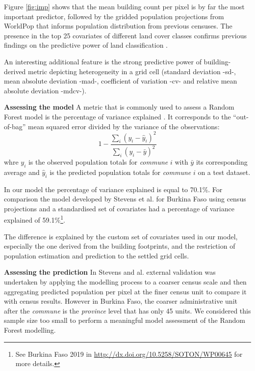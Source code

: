 \documentclass[]{book}
\begin{document}
Figure \ref{fig:imp} shows that the mean building count per pixel is by
far the most important predictor, followed by the gridded population
projections from WorldPop that informs population distribution from
previous censuses. The presence in the top 25 covariates of different
land cover classes confirms previous findings on the predictive power of
land classification \citep{lloyd2019global}.

An interesting additional feature is the strong predictive power of
building-derived metric depicting heterogeneity in a grid cell (standard
deviation -sd-, mean absolute deviation -mad-, coefficient of variation
-cv- and relative mean absolute deviation -mdcv-).

\textbf{Assessing the model} A metric that is commonly used to assess a
Random Forest model is the percentage of variance explained
\citep{liaw2002}. It corresponds to the ``out-of-bag'' mean squared
error divided by the variance of the observations:
\[1 - \frac{\sum_i (y_i - \hat{y}_i)^2}{\sum_i (y_i - \bar{y})^2}\]whre
\(y_i\) is the observed population totals for \emph{commune} \(i\) with
\(\bar{y}\) its corresponding average and \(\hat{y}_i\) is the predicted
population totals for \emph{commune} \(i\) on a test dataset.

In our model the percentage of variance explained is equal to 70.1\%.
For comparison the model developed by Stevens et al.
\citeyearpar{stevens2015disaggregating} for Burkina Faso using census
projections and a standardised set of covariates \citep{lloyd2019global}
had a percentage of variance explained of 59.1\%\footnote{See Burkina
  Faso 2019 in \url{http://dx.doi.org/10.5258/SOTON/WP00645} for more
  details.}.

The difference is explained by the custom set of covariates used in our
model, especially the one derived from the building footprints, and the
restriction of population estimation and prediction to the settled grid
cells.

\textbf{Assessing the prediction} In Stevens and al.
\citeyearpar{stevens2015disaggregating} external validation was
undertaken by applying the modelling process to a coarser census scale
and then aggregating predicted population per pixel at the finer census
unit to compare it with census results. However in Burkina Faso, the
coarser administrative unit after the \emph{commune} is the
\emph{province} level that has only 45 units. We considered this sample
size too small to perform a meaningful model assessment of the Random
Forest modelling.
\end{document}
